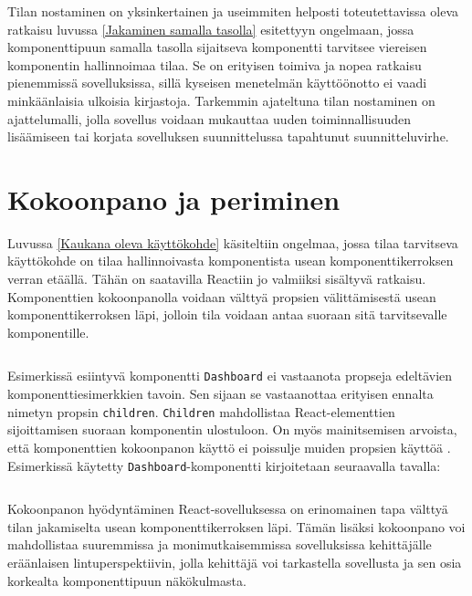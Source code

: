 Tilan nostaminen on yksinkertainen ja useimmiten helposti toteutettavissa oleva ratkaisu luvussa \ref{Jakaminen samalla tasolla} esitettyyn ongelmaan, jossa komponenttipuun samalla tasolla sijaitseva komponentti tarvitsee viereisen komponentin hallinnoimaa tilaa. Se on erityisen toimiva ja nopea ratkaisu pienemmissä sovelluksissa, sillä kyseisen menetelmän käyttöönotto ei vaadi minkäänlaisia ulkoisia kirjastoja. Tarkemmin ajateltuna tilan nostaminen on ajattelumalli, jolla sovellus voidaan mukauttaa uuden toiminnallisuuden lisäämiseen tai korjata sovelluksen suunnittelussa tapahtunut suunnitteluvirhe.


\section{Kokoonpano ja periminen}
\label{Kokoonpano ja periminen}

Luvussa \ref{Kaukana oleva käyttökohde} käsiteltiin ongelmaa, jossa tilaa tarvitseva käyttökohde on tilaa hallinnoivasta komponentista usean komponenttikerroksen verran etäällä. Tähän on saatavilla Reactiin jo valmiiksi sisältyvä ratkaisu. Komponenttien kokoonpanolla voidaan välttyä propsien välittämisestä usean komponenttikerroksen läpi, jolloin tila voidaan antaa suoraan sitä tarvitsevalle komponentille. \cite{reactdocscomposition}
\inputminted[bgcolor=black,highlightlines={6,12},highlightcolor=darkgray]{jsx.py:JsxLexer -x}{listaukset/composition1.js}
Esimerkissä esiintyvä komponentti \texttt{Dashboard} ei vastaanota propseja edeltävien komponenttiesimerkkien tavoin. Sen sijaan se vastaanottaa erityisen ennalta nimetyn propsin \texttt{children}. \texttt{Children} mahdollistaa React-elementtien sijoittamisen suoraan komponentin ulostuloon. On myös mainitsemisen arvoista, että komponenttien kokoonpanon käyttö ei poissulje muiden propsien käyttöä \cite{reactdocscomposition}. Esimerkissä käytetty \texttt{Dashboard}-komponentti kirjoitetaan seuraavalla tavalla:
\inputminted[bgcolor=black,highlightlines={4},highlightcolor=darkgray]{jsx.py:JsxLexer -x}{listaukset/composition2.js}
Kokoonpanon hyödyntäminen React-sovelluksessa on erinomainen tapa välttyä tilan jakamiselta usean komponenttikerroksen läpi. Tämän lisäksi kokoonpano voi mahdollistaa suuremmissa ja monimutkaisemmissa sovelluksissa kehittäjälle eräänlaisen lintuperspektiivin, jolla kehittäjä voi tarkastella sovellusta ja sen osia korkealta komponenttipuun näkökulmasta.



